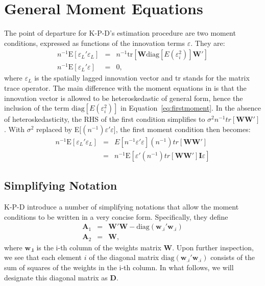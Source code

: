 \documentclass{article}
\begin{document}
\section{General Moment Equations}
The point of departure for K-P-D's estimation procedure are two 
moment conditions, expressed as functions of the innovation terms
$\varepsilon$. They are:
\begin{eqnarray}
 n^{-1} \mbox{E} [\varepsilon_L'\varepsilon_L] &=& n^{-1} \mbox{tr} [ \mathbf{W} \mbox{diag}[E(\varepsilon_i^2)] \mathbf{W'} ] \label{eq:firstmoment}\\ 
 n^{-1} \mbox{E} [\varepsilon_L'\varepsilon] &=& 0,
\end{eqnarray}
where $\varepsilon_L$ is the spatially lagged innovation vector and tr stands for the
matrix trace operator. The main difference
with the moment equations in \cite{KelejianPrucha:99a} is that the innovation vector
is allowed to be heteroskedastic of general form, hence the inclusion of the 
term $\mbox{diag}[E(\varepsilon_i^2)]$ in Equation~\ref{eq:firstmoment}. In the absence of heteroskedasticity, the
RHS of the first condition simplifies to $\sigma^2 n^{-1} tr [\mathbf{WW'}]$. With
$\sigma^2$ replaced by E[$(n^{-1}) \varepsilon' \varepsilon$], the first moment condition
then becomes:
\begin{eqnarray*}
 n^{-1} \mbox{E} [\varepsilon_L'\varepsilon_L] &=& E[ n^{-1}\varepsilon' \varepsilon] (n^{-1}) tr [\mathbf{WW'}]\\
   &=& n^{-1} \mbox{E} [ \varepsilon' (n^{-1}) tr[\mathbf{WW'}] \mathbf{I} \varepsilon ]
 \end{eqnarray*}

\subsection{Simplifying Notation}\label{ss:simplenotation}
K-P-D introduce a number of simplifying notations that allow the moment conditions to
be written in a very concise form. Specifically, they define
\begin{eqnarray}\label{eq:A1A2}
\mathbf{A}_1 &=& \mathbf{W'W} - \mbox{diag} (\mathbf{w}_{.i}'\mathbf{w}_{.i}) \label{eq:A1}\\
\mathbf{A}_2 &=& \mathbf{W}, \label{eq:A2}
\end{eqnarray}
where $\mathbf{w_{.i}}$ is the i-th column of the weights matrix $\mathbf{W}$. Upon
further inspection, we see that each element $i$ of the diagonal matrix 
$\mbox{diag} (\mathbf{w}_{.i}'\mathbf{w}_{.i})$ consists of the sum of squares of the
weights in the i-th column. In what follows, we will designate this diagonal matrix
as $\mathbf{D}$.
\end{document}

